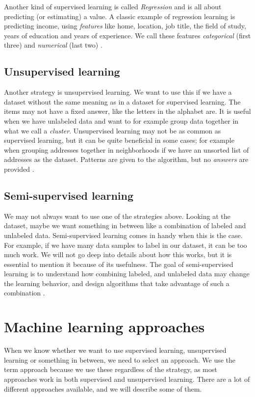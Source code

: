 Another kind of supervised learning is called \textit{Regression} and is all about predicting (or estimating) a value. A classic example of regression 
learning is predicting income, using \textit{features} like home, location, job title, the field of study,  years of education and years of experience. 
We call these features \textit{categorical} (first three) and \textit{numerical} (last two) \cite{supervised_learning}. 

\subsection{Unsupervised learning}
Another strategy is unsupervised learning. We want to use this if we have a dataset without the same meaning as in a dataset for supervised learning. 
The items may not have a fixed answer, like the letters in the alphabet are. It is useful when we have unlabeled data and want to for example group data 
together in what we call a \textit{cluster}. Unsupervised learning may not be as common as supervised learning, but it can be quite 
beneficial in some cases; for example when grouping addresses together in neighborhoods if we have an unsorted list of addresses as the dataset. Patterns are given to the algorithm, but no \textit{answers} are provided \cite{unsupervised_learning}. 

\subsection{Semi-supervised learning}
We may not always want to use one of the strategies above. Looking at the dataset, maybe we want something in between like a combination of labeled and unlabeled data. Semi-supervised learning comes in handy when this is the case. For example, if we have many data samples to label in our dataset, it can be too much work. We will not go deep into details about how this works, but it is essential to mention it because of its usefulness. The goal of semi-supervised learning is to understand how combining labeled, and unlabeled data may change the learning behavior, and design algorithms that take advantage of such a combination \cite{semisupervised_learning}.

\section{Machine learning approaches}
When we know whether we want to use supervised learning, unsupervised learning or something in between, we need to select an approach. We use the term approach because we use these regardless of the strategy, as most approaches work in both supervised and unsupervised learning. There are a lot of different approaches available, and we will describe some of them.

